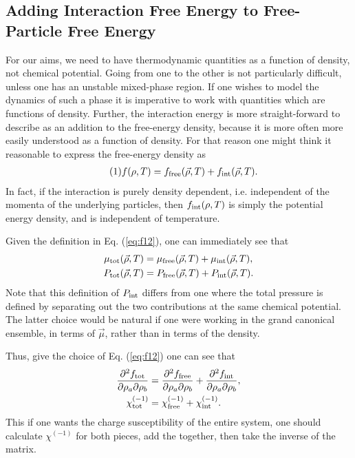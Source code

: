\documentclass[12pt]{article}
\numberwithin{equation}{section}
\numberwithin{figure}{section}
\newcommand\eqnumber{\addtocounter{equation}{1}\tag{\theequation}}
\begin{document}
\subsection{Adding Interaction Free Energy to Free-Particle Free Energy}

For our aims, we need to have thermodynamic quantities as a function of density, not chemical potential. Going from one to the other is not particularly difficult, unless one has an unstable mixed-phase region. If one wishes to model the dynamics of such a phase it is imperative to work with quantities which are functions of density. Further, the interaction energy is more straight-forward to describe as an addition to the free-energy density, because it is more often more easily understood as a function of density. For that reason one might think it reasonable to express the free-energy density as
\begin{align*}\eqnumber
f(\rho,T)&=f_{\rm free}(\vec{\rho},T)+f_{\rm int}(\vec{\rho},T).
\end{align*}
In fact, if the interaction is purely density dependent, i.e. independent of the momenta of the underlying particles, then $f_{\rm int}(\rho,T)$ is simply the potential energy density, and is independent of temperature.

Given the definition in Eq. (\ref{eq:f12}), one can immediately see that
\begin{align*}
\mu_{\rm tot}(\vec{\rho},T)&=\mu_{\rm free}(\vec{\rho},T)+\mu_{\rm int}(\vec{\rho},T),\\
P_{\rm tot}(\vec{\rho},T)&=P_{\rm free}(\vec{\rho},T)+P_{\rm int}(\vec{\rho},T).
\end{align*}
Note that this definition of $P_{\rm int}$ differs from one where the total pressure is defined by separating out the two contributions at the same chemical potential. The latter choice would be natural if one were working in the grand canonical ensemble, in terms of $\vec{\mu}$, rather than in terms of the density.

Thus, give the choice of Eq. (\ref{eq:f12}) one can see that
\begin{align*}
\frac{\partial^2f_{\rm tot}}{\partial\rho_a\partial\rho_b}&=
\frac{\partial^2f_{\rm free}}{\partial\rho_a\partial\rho_b}+\frac{\partial^2f_{\rm int}}{\partial\rho_a\partial\rho_b},\\
\chi^{(-1)}_{\rm tot}&=\chi^{(-1)}_{\rm free}+\chi^{(-1)}_{\rm int}.
\end{align*}
This if one wants the charge susceptibility of the entire system, one should calculate $\chi^{(-1)}$ for both pieces, add the together, then take the inverse of the matrix.
\end{document}
